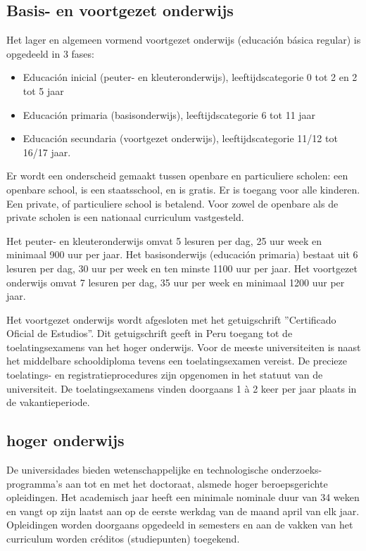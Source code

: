 \subsection{Basis- en voortgezet onderwijs}
Het lager en algemeen vormend voortgezet onderwijs (educación básica regular) is opgedeeld in 3 fases:
 \begin{itemize}
\item Educación inicial (peuter- en kleuteronderwijs), leeftijdscategorie 0 tot 2 en 2 tot 5 jaar
\item Educación primaria (basisonderwijs), leeftijdscategorie 6 tot 11 jaar
\item Educación secundaria (voortgezet onderwijs), leeftijdscategorie 11/12 tot 16/17 jaar.
\end{itemize}
Er wordt een onderscheid gemaakt tussen openbare en particuliere scholen: een openbare school, is een staatsschool, en is gratis. Er is toegang voor alle kinderen. Een private, of particuliere school is betalend.  Voor zowel de openbare als de private scholen is een nationaal curriculum vastgesteld. \autocite{Nuffic2015}

Het peuter- en kleuteronderwijs omvat 5 lesuren per dag, 25 uur week en minimaal 900 uur per jaar. Het basisonderwijs (educación primaria) bestaat uit 6 lesuren per dag, 30 uur per week en ten minste 1100 uur per jaar. Het voortgezet onderwijs omvat 7 lesuren per dag, 35 uur per week en minimaal 1200 uur per jaar. \autocite{Nuffic2015}

Het voortgezet onderwijs wordt afgesloten met het getuigschrift ''Certificado Oficial de Estudios''. Dit getuigschrift geeft in Peru toegang tot de toelatingsexamens van het hoger onderwijs. Voor de meeste universiteiten is naast het middelbare schooldiploma tevens een toelatingsexamen vereist. De precieze toelatings- en registratieprocedures zijn opgenomen in het statuut van de universiteit. De toelatingsexamens vinden doorgaans 1 à 2 keer per jaar plaats in de vakantieperiode. \autocite{Nuffic2015}

\subsection{hoger onderwijs}
De universidades bieden wetenschappelijke en technologische onderzoeks-programma’s aan tot en met het doctoraat, alsmede hoger beroepsgerichte opleidingen. Het academisch jaar heeft een minimale nominale duur van 34 weken en vangt op zijn laatst aan op de eerste werkdag van de maand april van elk jaar. Opleidingen worden doorgaans opgedeeld in semesters en aan de vakken van het curriculum worden créditos (studiepunten) toegekend. \autocite{Nuffic2015}


